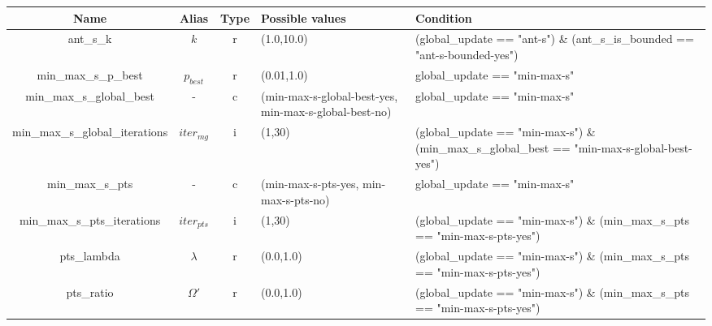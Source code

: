 \documentclass[12pt,a4paper,oneside]{book}
\begin{document}
\begin{table}[]
\centering
\begin{tabular}{|c|c|c|p{4cm}|p{4cm}|}
\hline
\textbf{Name}  & \textbf{Alias}      & \textbf{Type} & \textbf{Possible values}                                                                & \textbf{Condition}                                                                                     \\ \hline
ant\_s\_k                       & $k$        & r    & (1.0,10.0)                                                                     & (global\_update == "ant-s") \& (ant\_s\_is\_bounded == "ant-s-bounded-yes")                   \\ \hline
min\_max\_s\_p\_best            & $p_{best}$ & r    & (0.01,1.0)                                                                     & global\_update == "min-max-s"                                                                 \\ \hline
min\_max\_s\_global\_best       & -          & c    & (min-max-s-global-best-yes, min-max-s-global-best-no)                           & global\_update == "min-max-s"                                                                 \\ \hline
min\_max\_s\_global\_iterations & $iter_{mg}$ & i    & (1,30)                                                                         & (global\_update == "min-max-s") \& (min\_max\_s\_global\_best == "min-max-s-global-best-yes") \\ \hline
min\_max\_s\_pts                & -          & c    & (min-max-s-pts-yes, min-max-s-pts-no)                                           & global\_update == "min-max-s"                                                                 \\ \hline
min\_max\_s\_pts\_iterations    & $iter_{pts}$ & i    & (1,30)                                                                         & (global\_update == "min-max-s") \& (min\_max\_s\_pts == "min-max-s-pts-yes")                  \\ \hline
pts\_lambda                     & $\lambda$  & r    & (0.0,1.0)                                                                      & (global\_update == "min-max-s") \& (min\_max\_s\_pts == "min-max-s-pts-yes")                  \\ \hline
pts\_ratio                      & $\Omega'$  & r    & (0.0,1.0)                                                                      & (global\_update == "min-max-s") \& (min\_max\_s\_pts == "min-max-s-pts-yes")                  \\ \hline

\end{tabular}
\end{table}
\end{document}

